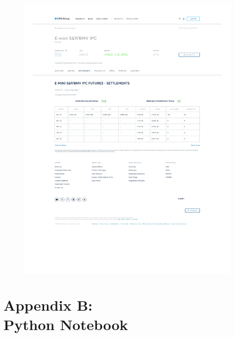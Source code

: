 \documentclass[11pt,a4paper]{article} %
\let\oldsection\section
\renewcommand{\section}{%
    \clearpage
    \thispagestyle{myfancy}%
    \oldsection
  }
\begin{document}
\begin{figure}[h]
  \centering
  \includegraphics[width=0.99\textwidth]{appendix/IPC12SEP.pdf}
  \label{fig:ipc_settlements}
\end{figure}

\section{Appendix B: \\ Python Notebook }

\end{document}
